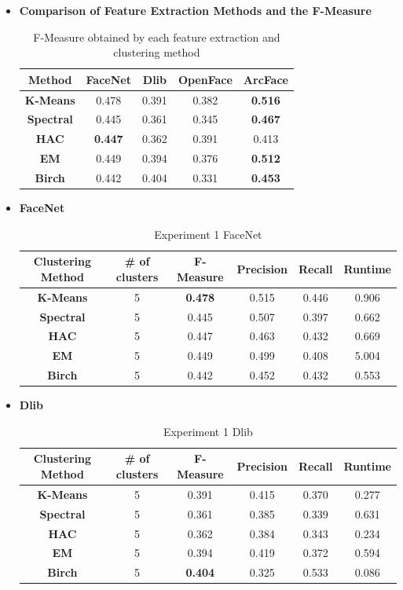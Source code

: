 \documentclass[12pt,english]{article}
\begin{document}
\begin{itemize}
\item \textbf{Comparison of Feature Extraction Methods and the F-Measure}
\begin{table}[H]
\centering
\begin{tabular}{||c c c c c||}
 \hline
Method & FaceNet & Dlib & OpenFace & ArcFace\\ [0.5ex]
 \hline\hline
 \textbf{K-Means} & 0.478 & 0.391 & 0.382 & \textbf{0.516}\\ 
 \hline
  \textbf{Spectral} & 0.445 & 0.361 & 0.345 & \textbf{0.467}\\
 \hline
 \textbf{HAC} & \textbf{0.447} & 0.362 & 0.391 & 0.413\\
 \hline
 \textbf{EM} & 0.449 & 0.394 & 0.376 & \textbf{0.512}\\
 \hline
 \textbf{Birch} & 0.442 & 0.404 & 0.331 & \textbf{0.453}\\
 \hline
\end{tabular}
\caption{F-Measure obtained by each feature extraction and clustering method}
\label{table:ex1}
\end{table}

\item \textbf{FaceNet}
\begin{table}[H]
\centering
\begin{tabular}{||c c c c c c||} 
 \hline
 Clustering Method & \# of clusters & F-Measure & Precision & Recall & Runtime\\ [0.5ex]
 \hline\hline
 \textbf{K-Means} & 5 & \textbf{0.478} & 0.515 & 0.446 & 0.906\\ 
 \hline
  \textbf{Spectral} & 5 & 0.445 & 0.507 & 0.397 & 0.662\\
 \hline
 \textbf{HAC} & 5 & 0.447 & 0.463 & 0.432 & 0.669\\
 \hline
 \textbf{EM} & 5 & 0.449 & 0.499 & 0.408 & 5.004\\
 \hline
 \textbf{Birch} & 5 & 0.442 & 0.452 & 0.432 & 0.553\\
 \hline
\end{tabular}
\caption{Experiment 1 FaceNet}
\label{table:ex1facenet}
\end{table}

\item \textbf{Dlib}
\begin{table}[H]
\centering
\begin{tabular}{||c c c c c c||} 
 \hline
 Clustering Method & \# of clusters & F-Measure & Precision & Recall & Runtime\\ [0.5ex]
 \hline\hline
 \textbf{K-Means} & 5 & 0.391 & 0.415 & 0.370 & 0.277\\ 
 \hline
  \textbf{Spectral} & 5 & 0.361 & 0.385 & 0.339 & 0.631\\
 \hline
 \textbf{HAC} & 5 & 0.362 & 0.384 & 0.343 & 0.234\\
 \hline
 \textbf{EM} & 5 & 0.394 & 0.419 & 0.372 & 0.594\\
 \hline
 \textbf{Birch} & 5 & \textbf{0.404} & 0.325 & 0.533 & 0.086\\
 \hline
\end{tabular}
\caption{Experiment 1 Dlib}
\label{table:ex1dlib}
\end{table}


\end{itemize}
\end{document}
